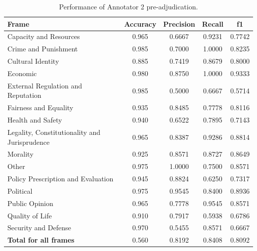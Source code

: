 \documentclass[
10pt, %
a4paper, %
oneside, %
headinclude,footinclude, %
] {book}%
\begin{document}
\begin{table}[htbp]
\centering
\begin{tabular}{|l|c|c|c|c|}
\hline
\textbf{Frame} & \textbf{Accuracy} & \textbf{Precision} & \textbf{Recall} & \textbf{f1} \\
\hline
Capacity and Resources & 0.965 & 0.6667 & 0.9231 & 0.7742 \\\hline
Crime and Punishment & 0.985 & 0.7000 & 1.0000 & 0.8235 \\\hline
Cultural Identity & 0.885 & 0.7419 & 0.8679 & 0.8000 \\\hline
Economic & 0.980 & 0.8750 & 1.0000 & 0.9333 \\\hline
External Regulation and Reputation & 0.985 & 0.5000 & 0.6667 & 0.5714 \\\hline
Fairness and Equality & 0.935 & 0.8485 & 0.7778 & 0.8116 \\\hline
Health and Safety & 0.940 & 0.6522 & 0.7895 & 0.7143 \\\hline
Legality, Constitutionality and Jurisprudence & 0.965 & 0.8387 & 0.9286 & 0.8814 \\\hline
Morality & 0.925 & 0.8571 & 0.8727 & 0.8649 \\\hline
Other & 0.975 & 1.0000 & 0.7500 & 0.8571 \\\hline
Policy Prescription and Evaluation & 0.945 & 0.8824 & 0.6250 & 0.7317 \\\hline
Political & 0.975 & 0.9545 & 0.8400 & 0.8936 \\\hline
Public Opinion & 0.965 & 0.7778 & 0.9545 & 0.8571 \\\hline
Quality of Life & 0.910 & 0.7917 & 0.5938 & 0.6786 \\\hline
Security and Defense & 0.970 & 0.5455 & 0.8571 & 0.6667 \\
\hline
\textbf{Total for all frames} & 0.560 & 0.8192 & 0.8408 & 0.8092 \\
\hline
\end{tabular}
\caption{Performance of Annotator 2 pre-adjudication.}
\label{tab:pre_annotator2_performance}
\end{table}
\end{document}
